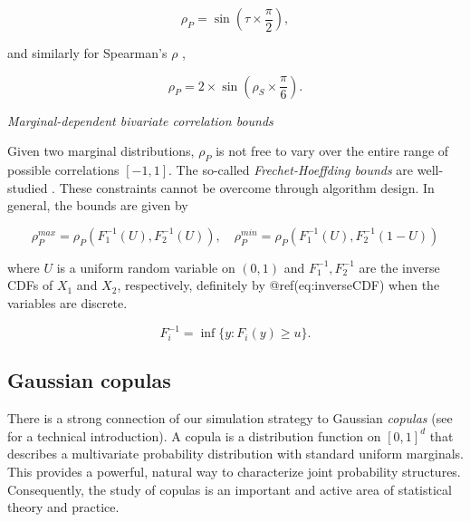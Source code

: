 \documentclass[
]{jss}
\begin{document}
\begin{equation}
\label{eq:convertKendall}
\rho_{P} = \sin \left( \tau \times \frac{\pi}{2} \right), 
\end{equation}

\noindent and similarly for Spearman's \(\rho\) \citep{K58},

\begin{equation}
\label{eq:convertSpearman}
\rho_P = 2 \times \sin \left( \rho_S \times \frac{\pi}{6} \right).
\end{equation}

\emph{Marginal-dependent bivariate correlation bounds}

Given two marginal distributions, \(\rho_P\) is not free to vary over
the entire range of possible correlations \([-1,1]\). The so-called
\emph{Frechet-Hoeffding bounds} are well-studied
\citep{Nelsen2007, BF17}. These constraints cannot be overcome through
algorithm design. In general, the bounds are given by

\begin{equation}
\label{eq:frechet}
\rho_P^{max} = \rho_P \left( F^{-1}_1 (U), F^{-1}_2 (U) \right), \quad \rho_P^{min} = \rho_P \left( F^{-1}_1 (U), F^{-1}_2 (1 - U) \right)
\end{equation}

\noindent where \(U\) is a uniform random variable on \((0,1)\) and
\(F^{-1}_1, F^{-1}_2\) are the inverse CDFs of \(X_1\) and \(X_2\),
respectively, definitely by @ref(eq:inverseCDF) when the variables are
discrete.

\begin{equation}
F_{i}^{-1} = \inf\{y:F_{i}(y) \geq u \}.
\label{eq:inverseCDF}
\end{equation}

\hypertarget{gaussian-copulas}{%
\subsection{Gaussian copulas}\label{gaussian-copulas}}

There is a strong connection of our simulation strategy to Gaussian
\emph{copulas} (see \citet{Nelsen2007} for a technical introduction). A
copula is a distribution function on \([0,1]^d\) that describes a
multivariate probability distribution with standard uniform marginals.
This provides a powerful, natural way to characterize joint probability
structures. Consequently, the study of copulas is an important and
active area of statistical theory and practice.
\end{document}
